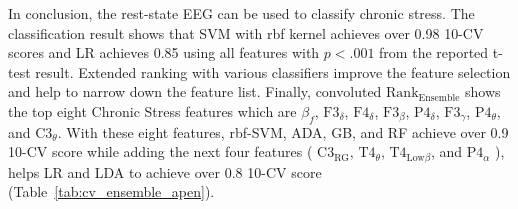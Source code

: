 \documentclass[pdflatex,sn-mathphys]{sn-jnl}%
\theoremstyle{thmstyleone}%
\theoremstyle{thmstyletwo}%
\theoremstyle{thmstylethree}%
\begin{document}
In conclusion, the rest-state EEG can be used to classify chronic stress. The classification result shows that SVM with rbf kernel achieves over 0.98 10-CV scores and LR achieves 0.85 using all features with $p < .001$ from the reported t-test result. Extended ranking with various classifiers improve the feature selection and help to narrow down the feature list. Finally, convoluted $\text{Rank}_{\text{Ensemble}}$ shows the top eight Chronic Stress features which are $\beta_{f}$, $\text{F3}_{\delta}$, $\text{F4}_{\delta}$, $\text{F3}_{\beta}$, $\text{P4}_{\delta}$, $\text{F3}_{\gamma}$, $\text{P4}_{\theta}$, and $\text{C3}_{\theta}$. With these eight features, rbf-SVM, ADA, GB, and RF achieve over 0.9 10-CV score while adding the next four features ( $\text{C3}_{\text{RG}}$, $\text{T4}_{\theta}$, $\text{T4}_{\text{Low}\beta}$, and $\text{P4}_{\alpha}$ ), helps LR and LDA to achieve over 0.8 10-CV score (Table~\ref{tab:cv_ensemble_apen}). 











\end{document}
